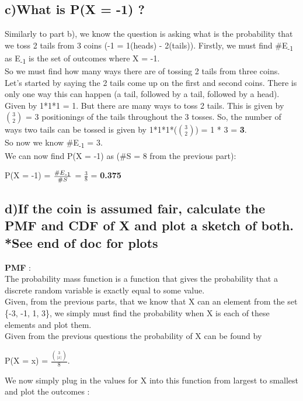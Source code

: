 \documentclass{report}
\begin{document}
        \subsection*{c)What is P(X = -1) ?}
            Similarly to part b), we know the question is asking what is the probability that we toss 2 tails from 3 coins (-1 = 1(heads) - 2(tails)).
            Firstly, we must find \#E\textsubscript{-1} as E\textsubscript{-1} is the set of outcomes where X = -1.\\
            So we must find how many ways there are of tossing 2 tails from three coins.\\
            Let's started by saying the 2 tails come up on the first and second coins. There is only one way this can happen (a tail, followed by a tail, followed by a head).
            Given by 1*1*1 = 1. But there are many ways to toss 2 tails. This is given by ${3 \choose 2}$ = 3 positionings of the tails throughout the 3 tosses.
            So, the number of ways two tails can be tossed is given by 1*1*1*(${3 \choose 2}$) = 1 * 3 = \textbf{3}.\\
            So now we know \#E\textsubscript{-1} = 3.\\
            We can now find P(X = -1) as (\#S = 8 from the previous part):
            
            \begin{center}
                P(X = -1) = $\frac{\#E\textsubscript{-1}}{\#S}$ = $\frac{3}{8}$ = \textbf{0.375}
            \end{center}



        \subsection*{d)If the coin is assumed fair, calculate the PMF and CDF of X and plot a sketch of both. *See end of doc for plots}
            \textbf{PMF} : \\
            The probability mass function is a function that gives the probability that a discrete random variable is exactly equal to some value.\\
            Given, from the previous parts, that we know that X can an element from the set \{-3, -1, 1, 3\}, we simply must find the probability when X is each of these elements and 
            plot them.\\
            Given from the previous questions the probability of X can be found by
            \begin{center}
                P(X = x) = $\frac{{3 \choose \vert x \vert}}{8}$.
            \end{center}
            We now simply plug in the values for X into this function from largest to smallest and plot the outcomes :
\end{document}

